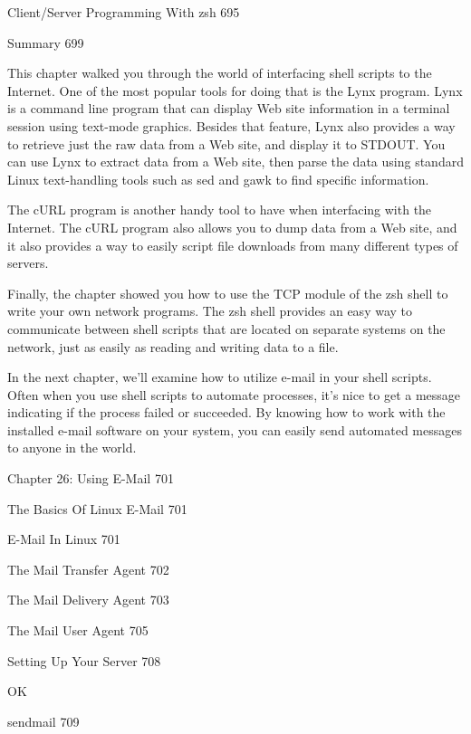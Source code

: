 Client/Server Programming With zsh 695



Summary 699

This chapter walked you through the world of interfacing shell scripts to the Internet. One of the most popular tools for doing that is the Lynx program. Lynx is a command line program that can display Web site information in a terminal session using text-mode graphics. Besides that feature, Lynx also provides a way to retrieve just the raw data from a Web site, and display it to STDOUT. You can use Lynx to extract data from a Web site, then parse the data using standard Linux text-handling tools such as sed and gawk to find specific information.

The cURL program is another handy tool to have when interfacing with the Internet. The cURL program also allows you to dump data from a Web site, and it also provides a way to easily script file downloads from many different types of servers.

Finally, the chapter showed you how to use the TCP module of the zsh shell to write your own network programs. The zsh shell provides an easy way to communicate between shell scripts that are located on separate systems on the network, just as easily as reading and writing data to a file.

In the next chapter, we'll examine how to utilize e-mail in your shell scripts. Often when you use shell scripts to automate processes, it's nice to get a message indicating if the process failed or succeeded. By knowing how to work with the installed e-mail software on your system, you can easily send automated messages to anyone in the world.

Chapter 26: Using E-Mail 701



The Basics Of Linux E-Mail 701



E-Mail In Linux 701



The Mail Transfer Agent 702



The Mail Delivery Agent 703



The Mail User Agent 705



Setting Up Your Server 708

OK

sendmail 709



